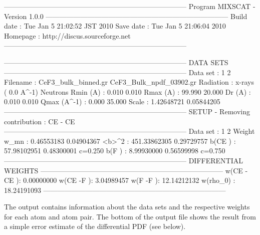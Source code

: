 \begin{MacVerbatim}
 ------------------------------------------------------------------------------
 Program MIXSCAT - Version 1.0.0     
 ------------------------------------------------------------------------------
 Build date : Tue Jan  5 21:02:52 JST 2010       
 Save date  : Tue Jan  5 21:06:04 2010
 Homepage   : http://discus.sourceforge.net
 ------------------------------------------------------------------------------

 ------------------------------------------------------------------------------
 DATA SETS
 ------------------------------------------------------------------------------
 Data set    :                         1                           2
 Filename    :       CeF3_bulk_binned.gr     CeF3_Bulk_npdf_03902.gr
 Radiation   :       x-rays (  0.0 A^-1)                    Neutrons
 Rmin (A)    :                     0.010                       0.010
 Rmax (A)    :                    99.990                      20.000
 Dr (A)      :                     0.010                       0.010
 Qmax (A^-1) :                     0.000                      35.000
 Scale       :                1.42648721                  0.05844205
 ------------------------------------------------------------------------------
 SETUP - Removing contribution : CE - CE
 ------------------------------------------------------------------------------
 Data set    :                         1                           2
 Weight w_mn :                0.46553183                  0.04904367
 <b>^2       :              451.33862305                  0.29729757
 b(CE  )     :               57.98102951                  0.48300001    c=0.250
 b(F   )     :                8.99930000                  0.56599998    c=0.750
 ------------------------------------------------------------------------------
 DIFFERENTIAL WEIGHTS
 ------------------------------------------------------------------------------
 w(CE  -CE  ):                0.00000000
 w(CE  -F   ):                3.04989457
 w(F   -F   ):               12.14212132
 w(rho_0)    :               18.24191093
 ------------------------------------------------------------------------------
\end{MacVerbatim}

The output contains information about the data sets and the respective weights 
for each atom and atom pair. The bottom of the output file shows the result from 
a simple error estimate of the differential PDF (see below).

